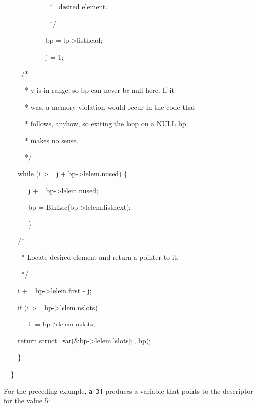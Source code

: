 {\ttfamily\mdseries
\ \ \ \ \ \ \ \ \ \ \ \ \ * \ desired element.}

{\ttfamily\mdseries
\ \ \ \ \ \ \ \ \ \ \ \ \ */}

{\ttfamily\mdseries
\ \ \ \ \ \ \ \ \ \ \ \ bp = lp-{\textgreater}listhead;}

{\ttfamily\mdseries
\ \ \ \ \ \ \ \ \ \ \ \ j = 1;}

{\ttfamily\mdseries
\ \  \ \ \ /*}

{\ttfamily\mdseries
\ \  \ \ \ \ * y is in range, so bp can never be null here. If it}

{\ttfamily\mdseries
\ \  \ \ \ \ * was, a memory violation would occur in the code that}

{\ttfamily\mdseries
\ \  \ \ \ \ * follows, anyhow, so exiting the loop on a NULL bp}

{\ttfamily\mdseries
\ \  \ \ \ \ * makes no sense.}

{\ttfamily\mdseries
\ \  \ \ \ \ */}

{\ttfamily\mdseries
\ \  \ \ while (i {\textgreater}= j + bp-{\textgreater}lelem.nused) \{}

{\ttfamily\mdseries
\ \  \ \ \ \ \ j += bp-{\textgreater}lelem.nused;}

{\ttfamily\mdseries
\ \  \ \ \ \ \ bp = BlkLoc(bp-{\textgreater}lelem.listnext);}

{\ttfamily\mdseries
\ \  \ \ \ \ \ \}}


\bigskip


\ \  \ \ /*

{\ttfamily
\textrm{\ \  \ \ \ }* Locate desired element and return a pointer to it.}

{\ttfamily
\ \  \ \ \ */}

{\ttfamily
\ \  \ \ i += bp-{\textgreater}lelem.first - j;}

{\ttfamily
\ \  \ \ if (i {\textgreater}= bp-{\textgreater}lelem.nslots)}

{\ttfamily
\ \  \ \ \ \ \ i -= bp-{\textgreater}lelem.nslots;}

{\ttfamily
\ \  \ \ return struct\_var(\&bp-{\textgreater}lelem.lslots[i], bp);}

{\ttfamily
\ \  \ \ \}}

{\ttfamily
\ \  \}}


For the preceding example, \texttt{a[3]} produces a variable that
points to the descriptor for the value 5:

